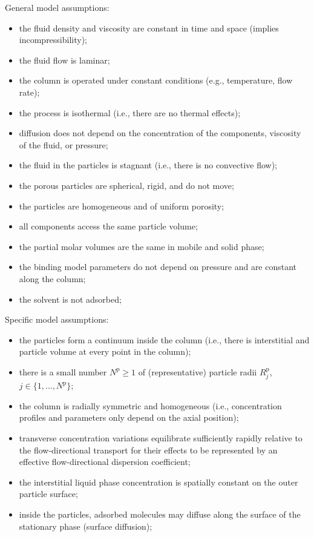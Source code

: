 \documentclass{article}
\begin{document}
General model assumptions:
\begin{itemize}
    \item the fluid density and viscosity are constant in time and space (implies incompressibility);
    \item the fluid flow is laminar;
    \item the column is operated under constant conditions (e.g., temperature, flow rate);
    \item the process is isothermal (i.e., there are no thermal effects);
    \item diffusion does not depend on the concentration of the components, viscosity of the fluid, or pressure;
    \item the fluid in the particles is stagnant (i.e., there is no convective flow);
    \item the porous particles are spherical, rigid, and do not move;
    \item the particles are homogeneous and of uniform porosity;
    \item all components access the same particle volume;
    \item the partial molar volumes are the same in mobile and solid phase;
    \item the binding model parameters do not depend on pressure and are constant along the column;
    \item the solvent is not adsorbed;
\end{itemize}

Specific model assumptions:
\begin{itemize}
    \item the particles form a continuum inside the column (i.e., there is interstitial and particle volume at every point in the column);
    \item there is a small number $N^{\mathrm{p}}\geq 1$ of (representative) particle radii $R^{\mathrm{p}}_{j}$, $j \in \{ 1, \dots, N^{\mathrm{p}} \}$;
    \item the column is radially symmetric and homogeneous (i.e., concentration profiles and parameters only depend on the axial position);
    \item transverse concentration variations equilibrate sufficiently rapidly relative to the flow-directional transport for their effects to be represented by an effective flow-directional dispersion coefficient;
    \item the interstitial liquid phase concentration is spatially constant on the outer particle surface;
    \item inside the particles, adsorbed molecules may diffuse along the surface of the stationary phase (surface diffusion);
\end{itemize}
\end{document}
